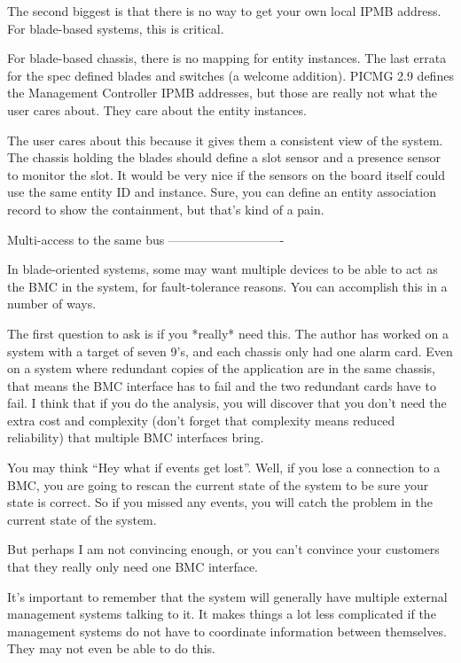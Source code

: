The second biggest is that there is no way to get your own local IPMB
address.  For blade-based systems, this is critical.

For blade-based chassis, there is no mapping for entity instances.
The last errata for the spec defined blades and switches (a welcome
addition).  PICMG 2.9 defines the Management Controller IPMB
addresses, but those are really not what the user cares about.  They
care about the entity instances.

The user cares about this because it gives them a consistent view of
the system.  The chassis holding the blades should define a slot
sensor and a presence sensor to monitor the slot.  It would be very
nice if the sensors on the board itself could use the same entity ID
and instance.  Sure, you can define an entity association record to
show the containment, but that's kind of a pain.


Multi-access to the same bus
----------------------------

In blade-oriented systems, some may want multiple devices to be able
to act as the BMC in the system, for fault-tolerance reasons.  You can
accomplish this in a number of ways.

The first question to ask is if you *really* need this.  The author
has worked on a system with a target of seven 9's, and each chassis
only had one alarm card.  Even on a system where redundant copies of
the application are in the same chassis, that means the BMC interface
has to fail and the two redundant cards have to fail.  I think that if
you do the analysis, you will discover that you don't need the extra
cost and complexity (don't forget that complexity means reduced
reliability) that multiple BMC interfaces bring.

You may think ``Hey what if events get lost''.  Well, if you lose a
connection to a BMC, you are going to rescan the current state of the
system to be sure your state is correct.  So if you missed any events,
you will catch the problem in the current state of the system.

But perhaps I am not convincing enough, or you can't convince your
customers that they really only need one BMC interface.

It's important to remember that the system will generally have
multiple external management systems talking to it.  It makes things a
lot less complicated if the management systems do not have to
coordinate information between themselves.  They may not even be able
to do this.

